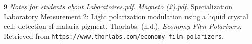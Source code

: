\documentclass[12pt,a4paper]{article}
\begin{document}
\begin{thebibliography}{9}
     \textit{Notes for students about Laboratoires.pdf}.
     \textit{Magneto (2).pdf}. Specialization Laboratory Measurement 2: Light polarization modulation using a liquid crystal cell: detection of malaria pigment. 
     Thorlabs. (n.d.). \textit{Economy Film Polarizers}. Retrieved from \texttt{https://www.thorlabs.com/economy-film-polarizers}.
\end{thebibliography}
\end{document}
